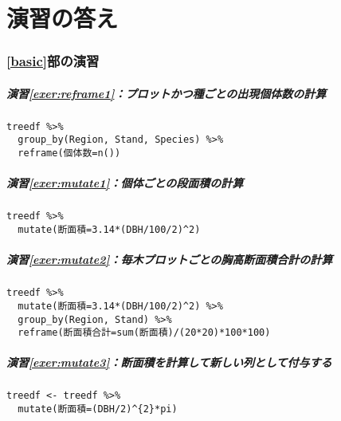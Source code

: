%


\part{演習の答え}
\label{answers}
\section*{\ref{basic}部の演習}
    \subsubsection*{演習\ref{exer:reframe1}：プロットかつ種ごとの出現個体数の計算}
\begin{verbatim}
treedf %>%
  group_by(Region, Stand, Species) %>%
  reframe(個体数=n())
\end{verbatim}

    \subsubsection*{演習\ref{exer:mutate1}：個体ごとの段面積の計算}
\begin{verbatim}
treedf %>%
  mutate(断面積=3.14*(DBH/100/2)^2)
\end{verbatim}

    \subsubsection*{演習\ref{exer:mutate2}：毎木プロットごとの胸高断面積合計の計算}
\begin{verbatim}
treedf %>%
  mutate(断面積=3.14*(DBH/100/2)^2) %>%
  group_by(Region, Stand) %>%
  reframe(断面積合計=sum(断面積)/(20*20)*100*100)
\end{verbatim}

    \subsubsection*{演習\ref{exer:mutate3}：断面積を計算して新しい列として付与する}
\begin{verbatim}
treedf <- treedf %>%
  mutate(断面積=(DBH/2)^{2}*pi)
\end{verbatim}

